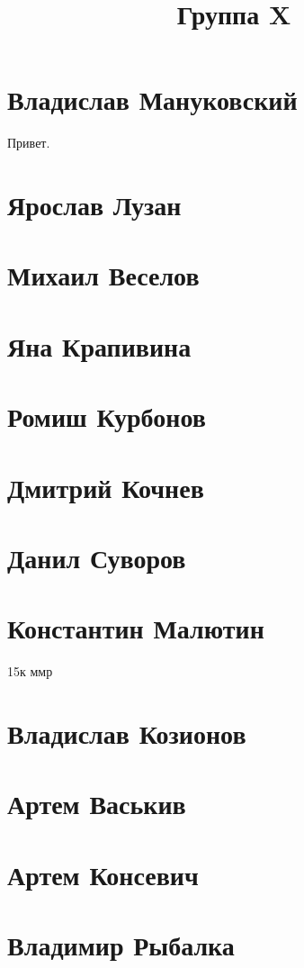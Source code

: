 \documentclass{article}
\title{Группа X}
\begin{document}
\section*{Владислав Мануковский}
Привет.
\section*{Ярослав Лузан}

\section*{Михаил Веселов}

\section*{Яна Крапивина}

\section*{Ромиш Курбонов}

\section*{Дмитрий Кочнев}

\section*{Данил Суворов}

\section*{Константин Малютин}
 15к ммр
\section*{Владислав Козионов}

\section*{Артем Васькив}

\section*{Артем Консевич}

\section*{Владимир Рыбалка}
\end{document}
